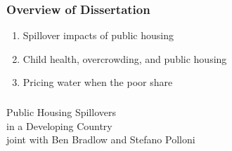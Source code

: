 \documentclass[aspectratio=149]{beamer}
\begin{document}
\begin{frame}
\frametitle{Overview of Dissertation}

\begin{enumerate}
\item Spillover impacts of public housing
\item Child health, overcrowding, and public housing
\item Pricing water when the poor share
\end{enumerate}
\end{frame}





\begin{frame}
\frametitle{}
\centering
{\Large \color{darkred} Public Housing Spillovers \\ in a Developing Country } \\
\vspace{.4cm}
joint with Ben Bradlow and Stefano Polloni
\end{frame}
\end{document}
